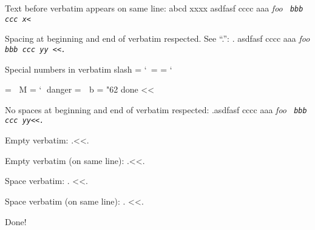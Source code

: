 
\noindent Text before verbatim appears on same line:\hfil\break
abcd  xxxx\here{<}       asdfasf   cccc
aaa \it foo \tt
     bbb 
ccc
\biz     x<

\noindent Spacing at beginning and end of verbatim respected. See ``.'':
.\here{<<} asdfasf   cccc
 aaa \it foo \tt
     bbb
ccc
\biz   yy  <<.

\noindent Special numbers in verbatim
\here{<<}
slash = `\
 = ^^M
 = `^^M

 = ^^K^^KM
 = `^^K
danger = ^^?
b = "62
done
<<

\noindent No spaces at beginning and end of verbatim respected:\hfil\break
.\here{<<}asdfasf   cccc
 aaa \it foo \tt
     bbb
ccc
\biz   yy<<.

\noindent Empty verbatim:\hfil\break
.\here{<<}<<.

\noindent Empty verbatim (on same line): .\here{<<}<<.

\noindent Space verbatim:\hfil\break
.\here{<<} <<.

\noindent Space verbatim (on same line): .\here{<<} <<.

\noindent Done!

\bye
